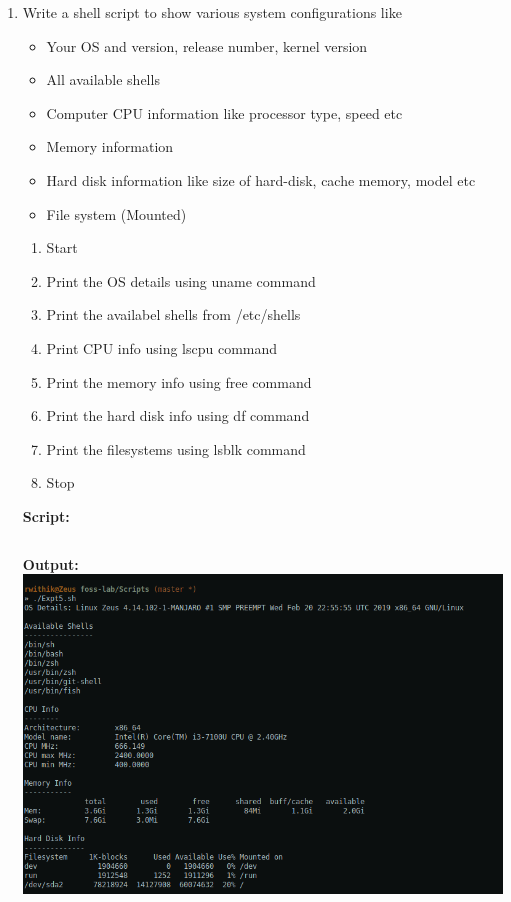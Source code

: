 \documentclass[10pt,a4paper,titlepage]{report}
\begin{document}
\begin{enumerate}
\pagebreak
\item Write a shell script to show various system configurations like
\begin{itemize}
\item Your OS and version, release number, kernel version
\item All available shells
\item Computer CPU information like processor type, speed etc
\item Memory information
\item Hard disk information like size of hard-disk, cache memory, model etc
\item File system (Mounted)
\end{itemize}
\begin{enumerate}
	\item Start
	\item Print the OS details using {\color{red}uname} command
	\item Print the availabel shells from /etc/shells
	\item Print CPU info using {\color{red}lscpu} command
	\item Print the memory info using {\color{red}free} command
	\item Print the hard disk info using {\color{red}df} command
	\item Print the filesystems using {\color{red}lsblk} command
	\item Stop
\end{enumerate}
\textbf{Script:}\newline
\inputminted{bash}{../Scripts/Set1/Expt5.sh}
\textbf{Output:}\newline
\includegraphics[width=\linewidth]{../Images/Shell1/2.png}

\end{enumerate}
\end{document}
